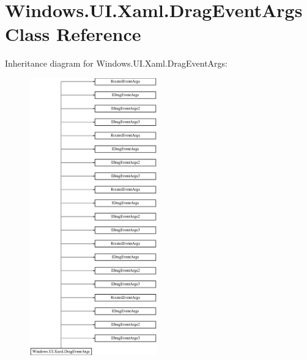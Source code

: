 \hypertarget{class_windows_1_1_u_i_1_1_xaml_1_1_drag_event_args}{}\section{Windows.\+U\+I.\+Xaml.\+Drag\+Event\+Args Class Reference}
\label{class_windows_1_1_u_i_1_1_xaml_1_1_drag_event_args}
Inheritance diagram for Windows.\+U\+I.\+Xaml.\+Drag\+Event\+Args\+:\begin{figure}[H]
\begin{center}
\leavevmode
\includegraphics[height=12.000000cm]{class_windows_1_1_u_i_1_1_xaml_1_1_drag_event_args}
\end{center}
\end{figure}
